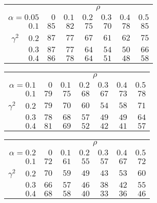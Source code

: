 \begin{tabular}{r|rrrrrr}
\hline\hline
 &\multicolumn{6}{c}{$\rho$} \\ 
 $\alpha = 0.05$ & $0$ & $0.1$ & $0.2$ & $0.3$ & $0.4$ & $0.5$ \\ 
 \hline$0.1$ & $85$ & $82$ & $75$ & $70$ & $78$ & $85$\\ 
$\gamma^2\;\;\;$ $0.2$ & $87$ & $77$ & $67$ & $61$ & $62$ & $75$\\ 
$0.3$ & $87$ & $77$ & $64$ & $54$ & $50$ & $66$\\ 
$0.4$ & $86$ & $78$ & $64$ & $51$ & $48$ & $58$\\ 
 \hline 
 \end{tabular}
 
 \vspace{2em} 
 
\begin{tabular}{r|rrrrrr}
\hline\hline
 &\multicolumn{6}{c}{$\rho$} \\ 
 $\alpha = 0.1$ & $0$ & $0.1$ & $0.2$ & $0.3$ & $0.4$ & $0.5$ \\ 
 \hline$0.1$ & $79$ & $75$ & $68$ & $67$ & $73$ & $78$\\ 
$\gamma^2\;\;\;$ $0.2$ & $79$ & $70$ & $60$ & $54$ & $58$ & $71$\\ 
$0.3$ & $78$ & $68$ & $57$ & $49$ & $49$ & $64$\\ 
$0.4$ & $81$ & $69$ & $52$ & $42$ & $41$ & $57$\\ 
 \hline 
 \end{tabular}
 
 \vspace{2em} 
 
\begin{tabular}{r|rrrrrr}
\hline\hline
 &\multicolumn{6}{c}{$\rho$} \\ 
 $\alpha = 0.2$ & $0$ & $0.1$ & $0.2$ & $0.3$ & $0.4$ & $0.5$ \\ 
 \hline$0.1$ & $72$ & $61$ & $55$ & $57$ & $67$ & $72$\\ 
$\gamma^2\;\;\;$ $0.2$ & $70$ & $59$ & $49$ & $43$ & $53$ & $60$\\ 
$0.3$ & $66$ & $57$ & $46$ & $38$ & $42$ & $55$\\ 
$0.4$ & $68$ & $58$ & $40$ & $33$ & $36$ & $46$\\ 
 \hline 
 \end{tabular}